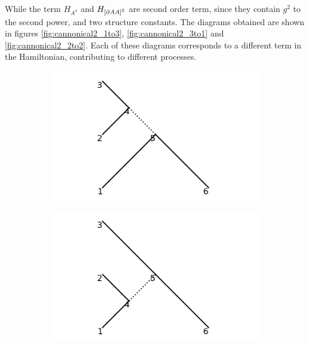 \documentclass[11pt,a4paper,twoside,pdf]{article}
\numberwithin{equation}{section}
\begin{document}
While the term $H_{A^4}$ and $H_{\left[ \partial A A \right]^2}$
are second order term, since they contain $g^2$ to the second power, and two structure constants.
The
diagrams obtained are shown in figures \ref{fig:cannonical2_1to3},
\ref{fig:cannonical2_3to1} and \ref{fig:cannonical2_2to2}. Each of these diagrams
corresponds to a different term in the Hamiltonian, contributing to different processes.

\begin{figure}[h!]
    \centering
    \begin{subfigure}[t]{0.33\textwidth}
        \centering
        \includegraphics[width=\textwidth]{plots/canonical/order2/1.png}
        \caption{ }
    \end{subfigure}%
    \begin{subfigure}[t]{0.33\textwidth}
        \centering
        \includegraphics[width=\textwidth]{plots/canonical/order2/2.png}
        \caption{ }
    \end{subfigure}

\end{figure}
\end{document}
